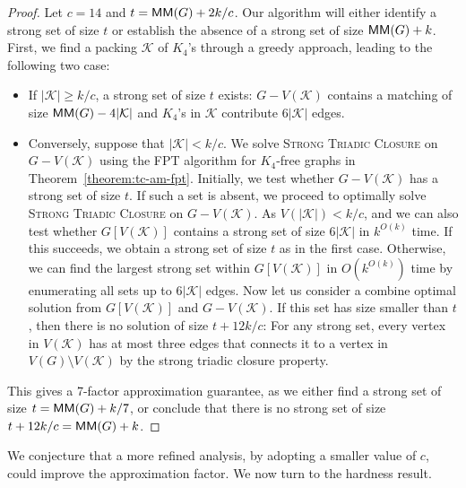 \begin{proof}
  Let $c = 14$ and $t = \mathsf{MM}(G) + 2k/c$.
  Our algorithm will either identify a strong set of size $t$ or establish the absence of a strong set of size $\mathsf{MM}(G) + k$.
  First, we find a packing $\mathcal{K}$ of $K_4$'s through a greedy approach, leading to the following two case:
  \begin{itemize}
    \item 
    If $|\mathcal{K}| \ge k/c$, a strong set of size $t$ exists:
    $G - V(\mathcal{K})$ contains a matching of size $\mathsf{MM}(G) - 4|\mathcal{K}|$ and $K_4$'s in $\mathcal{K}$ contribute $6|\mathcal{K}|$ edges.
    \item
    Conversely, suppose that $|\mathcal{K}| < k/c$.
    We solve \textsc{Strong Triadic Closure} on $G - V(\mathcal{K})$ using the FPT algorithm for $K_4$-free graphs in Theorem~\ref{theorem:tc-am-fpt}.
    Initially, we test whether $G - V(\mathcal{K})$ has a strong set of size $t$.
    If such a set is absent, we proceed to optimally solve \textsc{Strong Triadic Closure} on $G - V(\mathcal{K})$.
    As $V(|\mathcal{K}|) < k/c$, and we can also test whether $G[V(\mathcal{K})]$ contains a strong set of size $6|\mathcal{K}|$ in $k^{O(k)}$ time.
    If this succeeds, we obtain a strong set of size $t$ as in the first case.
    Otherwise, we can find the largest strong set within $G[V(\mathcal{K})]$ in $O(k^{O(k)})$ time by enumerating all sets up to $6|\mathcal{K}|$ edges.
    Now let us consider a combine optimal solution from $G[V(\mathcal{K})]$ and $G - V(\mathcal{K})$.
    If this set has size smaller than $t$, then there is no solution of size $t + 12k/c$:
    For any strong set, every vertex in $V(\mathcal{K})$ has at most three edges that connects it to a vertex in $V(G) \setminus V(\mathcal{K})$ by the strong triadic closure property.
  \end{itemize}
  This gives a 7-factor approximation guarantee, as we either find a strong set of size $t = \mathsf{MM}(G) + k/7$, or conclude that there is no strong set of size $t + 12k/c = \mathsf{MM}(G) + k$.
\end{proof}

We conjecture that a more refined analysis, by adopting a smaller value of $c$, could improve the approximation factor.
We now turn to the hardness result.

